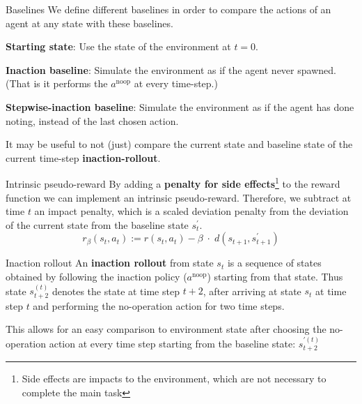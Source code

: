 \begin{Definition}{Baselines}{}{}
	We define different baselines in order to compare the actions of an agent at any state with these baselines.
	
	\textbf{Starting state}: Use the state of the environment at $t=0$.
	
	\textbf{Inaction baseline}: Simulate the environment as if the agent never spawned. (That is it performs the $a^{\text{noop}}$ at every time-step.)
	
	\textbf{Stepwise-inaction baseline}: Simulate the environment as if the agent has done noting, instead of the last chosen action.
	
	
	It may be useful to not (just) compare the current state and   baseline state of the current time-step \textbf{inaction-rollout}.
\end{Definition}

%

\begin{Definition}{Intrinsic pseudo-reward}{}{}
	By adding a \textbf{penalty for side effects}\footnote{Side effects are impacts to the environment, which are not necessary to complete the main task} to the reward function we can implement an intrinsic pseudo-reward.
	Therefore, we subtract at time $t$ an impact penalty, which is a scaled deviation penalty from the deviation of the current state from the baseline state $s_t^\prime$.
	\[  r_\beta(s_t, a_t) := r(s_t, a_t) - \beta \; \cdot \; d(s_{t+1}, s_{t+1}^\prime ) \]
\end{Definition}


\begin{Definition}{Inaction rollout}{}{}
	An \textbf{inaction rollout} from state $s_t$ is a sequence of states obtained by following the inaction policy ($a^{\text{noop}}$) starting from that state. Thus state $s_{t+2}^{(t)}$ denotes the state at time step $t+2$, after arriving at state $s_t$ at time step $t$ and performing the no-operation action for two time steps.
	
	This allows for an easy comparison to environment state after choosing the no-operation action at every time step starting from the baseline state: $s^{\prime(t)}_{t+2}$
\end{Definition}


